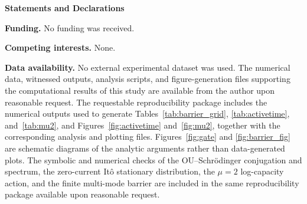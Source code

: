 \documentclass[11pt,a4paper]{article}
\theoremstyle{definition}
\begin{document}
\bigskip
\noindent\textbf{Statements and Declarations}

\medskip
\noindent\textbf{Funding.} No funding was received.

\medskip
\noindent\textbf{Competing interests.} None.

\medskip
\noindent\textbf{Data availability.}
No external experimental dataset was used. The numerical data,
witnessed outputs, analysis scripts, and figure-generation files
supporting the computational results of this study are available from
the author upon reasonable request. The requestable reproducibility
package includes the numerical outputs used to generate
Tables~\ref{tab:barrier_grid}, \ref{tab:activetime},
and~\ref{tab:mu2}, and Figures~\ref{fig:activetime} and~\ref{fig:mu2},
together with the
corresponding analysis and plotting files. Figures~\ref{fig:gate} and
\ref{fig:barrier_fig} are schematic diagrams of the analytic arguments
rather than data-generated plots. The symbolic and numerical checks of
the OU--Schr\"odinger conjugation and spectrum, the zero-current
It\^o stationary distribution, the $\mu=2$ log-capacity action, and the
finite multi-mode barrier are included in the same reproducibility
package available upon reasonable request.
\end{document}
